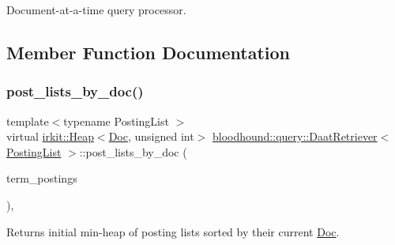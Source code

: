 Document-\/at-\/a-\/time query processor. 

\subsection{Member Function Documentation}
\mbox{\label{classbloodhound_1_1query_1_1DaatRetriever_abf9a1012732fe0879d1bf080faf293b6}} 
\subsubsection{\texorpdfstring{post\+\_\+lists\+\_\+by\+\_\+doc()}{post\_lists\_by\_doc()}}
{\footnotesize\ttfamily template$<$typename Posting\+List $>$ \\
virtual \hyperlink{classirkit_1_1Heap}{irkit\+::\+Heap}$<$\hyperlink{structbloodhound_1_1Doc}{Doc}, unsigned int$>$ \hyperlink{classbloodhound_1_1query_1_1DaatRetriever}{bloodhound\+::query\+::\+Daat\+Retriever}$<$ \hyperlink{classbloodhound_1_1PostingList}{Posting\+List} $>$\+::post\+\_\+lists\+\_\+by\+\_\+doc (\begin{DoxyParamCaption}\item[{const std\+::vector$<$ \hyperlink{classbloodhound_1_1PostingList}{Posting\+List} $>$ \&}]{term\+\_\+postings }\end{DoxyParamCaption})\hspace{0.3cm}{\ttfamily [inline]}, {\ttfamily [virtual]}}



Returns initial min-\/heap of posting lists sorted by their current \hyperlink{structbloodhound_1_1Doc}{Doc}. 

\mbox{\label{classbloodhound_1_1query_1_1DaatRetriever_ab80b4867fc263827dc2fdbe0965a2e8c}} 
